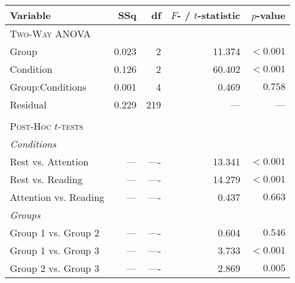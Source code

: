 \begin{tabular}{lrrrr}
\toprule
Variable &    SSq &     df &          $F$- / $t$-statistic &        $p$-value \\
\midrule
\textsc{Two-Way ANOVA} 	& 	& & & \\
Group                   &  0.023 &    2 &  11.374 &  $< 0.001$ \\
Condition               &  0.126 &    2 &  60.402 &  $< 0.001$ \\
Group:Conditions 		&  0.001 &    4 &   0.469 &  $0.758$ \\
Residual                &  0.229 &  219 &        --- &           --- \\
& & & & \\
\textsc{Post-Hoc $t$-tests} & & & & \\
\textit{Conditions} & & & & \\
Rest vs. Attention  	&  ---  &    ---- &  13.341 &  $< 0.001$ \\
Rest vs. Reading  	&  ---  &    ---- &  14.279 &  $< 0.001$ \\
Attention vs. Reading &  ---  &    ---- &  0.437 &  $0.663$ \\
\textit{Groups} & & & & \\
Group 1 vs. Group 2  &  ---  &    ---- &  0.604 &  $0.546$ \\
Group 1 vs. Group 3  &  ---  &    ---- &  3.733 &  $< 0.001$ \\
Group 2 vs. Group 3  &  ---  &    ---- &  2.869 &  $0.005$ \\
\bottomrule
\end{tabular}